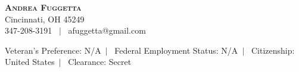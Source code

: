 \documentclass[letterpaper,12pt]{fed-res} %
\begin{document}
\begin{center}
    \textbf{\Huge \scshape Andrea Fuggetta} \\ \vspace{1pt}
    Cincinnati, OH 45249 \\ \vspace{1pt}
     347-208-3191 \ $|$ \ afuggetta@gmail.com \\ \vspace{1pt} %
\end{center}

Veteran's Preference: N/A\ $|$ \ Federal Employment Status: N/A\ $|$ \ Citizenship: United States\ $|$ \ Clearance: Secret










% 


\end{document}
